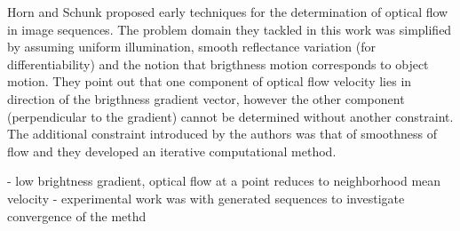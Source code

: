 \documentclass{article}
\begin{document}
Horn and Schunk proposed early techniques for the determination of optical flow in image sequences.  The problem domain they tackled in this work was simplified by assuming uniform illumination, smooth reflectance variation (for differentiability) and the notion that brigthness motion corresponds to object motion.  They point out that one component of optical flow velocity lies in direction of the brigthness gradient vector, however the other component (perpendicular to the gradient) cannot be determined without another constraint.  The additional constraint introduced by the authors was that of smoothness of flow and they developed an iterative computational method.


- low brightness gradient, optical flow at a point reduces to neighborhood mean velocity
- experimental work was with generated sequences to investigate convergence of the methd
\end{document}
